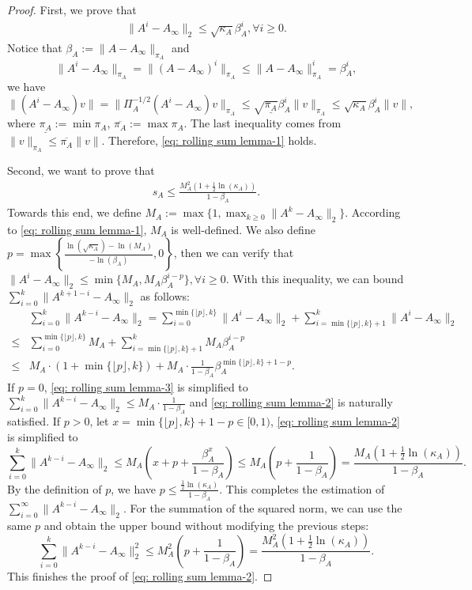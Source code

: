 \documentclass[10pt]{article}
\newcommand{\norm}[1]{\| #1 \|}
\begin{document}
\begin{proof}
First, we prove that
\begin{align}\label{eq: rolling sum lemma-1}
    \norm{A^i-A_\infty}_2\le \sqrt{\kappa_A}\beta_A^{i}, \forall i \ge 0.
 \end{align}
Notice that $\beta_A:=\norm{A-A_\infty}_{\pi_A}$ and \[\norm{A^i-A_\infty}_{\pi_A}= \norm{(A-A_\infty)^i}_{\pi_A}\le \norm{A-A_\infty}^i_{\pi_A}=\beta_A^i,\]
we have
\[
\norm{(A^{i}-A_\infty)v}=\norm{\Pi_A^{-1/2}(A^i-A_\infty)v}_{\pi_A}\le \sqrt{\underline{\pi_A}}\beta_A^i\norm{v}_{\pi_A}\le \sqrt{\kappa_A}\beta_A^i\norm{v},
\]
where $\underline{\pi_A}:=\min \pi_A$, $\overline{\pi_A}:=\max \pi_A$.
The last inequality comes from $\norm{v}_{\pi_A}\le \overline{\pi_A} \norm{v}$. Therefore, \eqref{eq: rolling sum lemma-1} holds.

Second, we want to prove that
\begin{align}\label{eq: rolling sum lemma-2}
    s_A\le \frac{M_A^2(1+\frac{1}{2}\ln(\kappa_A))}{1-\beta_A}.
\end{align}
Towards this end, we define $M_A:=\max\{1, \max_{k\ge 0}\norm{A^k-A_\infty}_2 \}$. According to \eqref{eq: rolling sum lemma-1}, $M_A$ is well-defined. We also define $p=\max\left\{\frac{\ln(\sqrt{\kappa_A})-\ln(M_A)}{-\ln(\beta_A)}, 0\right\}$,
then we can verify that $\norm{A^i-A_\infty}_2\le \min\{M_A, M_A\beta_A^{i-p}\},\forall i\ge 0.$ With this inequality, we can bound $\sum_{i=0}^k\norm{A^{k+1-i}-A_\infty}_2$ as follows:
\begin{align}\label{eq: rolling sum lemma-3}
    &\sum_{i=0}^k\norm{A^{k-i}-A_\infty}_2=\sum_{i=0}^{\min\{\lfloor p \rfloor, k\}}\norm{A^i-A_\infty}_2+ \sum_{i=\min\{\lfloor p \rfloor, k\}+1}^{k}\norm{A^{i}-A_\infty}_2\\
    \le &\sum_{i=0}^{\min\{\lfloor p \rfloor, k\}} M_A+\sum_{i=\min\{\lfloor p \rfloor, k\}+1}^{k} M_A\beta_A^{i-p}\nonumber\\
    \le & M_A\cdot (1+\min\{\lfloor p \rfloor, k\})+M_A\cdot \frac{1}{1-\beta_A}\beta_A^{\min\{\lfloor p \rfloor, k\}+1-p}.\nonumber
\end{align}
If $p=0$, \eqref{eq: rolling sum lemma-3} is simplified to $\sum_{i=0}^k\norm{A^{k-i}-A_\infty}_2\le M_A\cdot\frac{1}{1-\beta_A}$ and \eqref{eq: rolling sum lemma-2} is naturally satisfied.
If $p>0$, let $x=\min\{\lfloor p \rfloor, k\}+1-p\in [0,1)$, \eqref{eq: rolling sum lemma-2} is simplified to
\[
\sum_{i=0}^k\norm{A^{k-i}-A_\infty}_2\le M_A\!\left(x+p+\frac{\beta_A^x}{1-\beta_A}\right)\le M_A\!\left(p+\frac{1}{1-\beta_A}\right)=\frac{M_A(1+\frac12 \ln(\kappa_A))}{1-\beta_A}.
\]
By the definition of $p$, we have $p\le \frac{\frac{1}{2}\ln(\kappa_A)}{1-\beta_A}$. This completes the estimation of $\sum_{i=0}^{\infty}\norm{A^{k-i}-A_\infty}_2$. For the summation of the squared norm, we can use the same $p$ and obtain the upper bound without modifying the previous steps:
\[
\sum_{i=0}^k\norm{A^{k-i}-A_\infty}_2^2\le M_A^2\!\left(p+\frac{1}{1-\beta_A}\right)=\frac{M_A^2(1+\frac12 \ln(\kappa_A))}{1-\beta_A}.
\]
This finishes the proof of \eqref{eq: rolling sum lemma-2}.


\end{proof}
\end{document}
